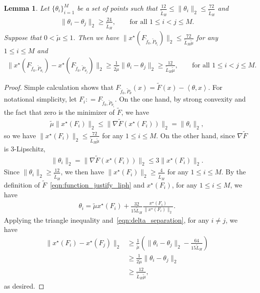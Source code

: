 \documentclass[11pt,twoside]{article}
\numberwithin{equation}{section}
\newcommand{\1}{\mathbf{1}}
\newcommand{\dotp}[1]{\left\langle #1\right\rangle}
\newtheorem{lemma}[theorem]{Lemma}
\theoremstyle{remark}
\theoremstyle{plain}
\begin{document}
\begin{lemma}\label{lem:far_noise_far_sol}
	Let $\{\theta_i\}_{i=1}^{M}$ be a set of points such that $\frac{12}{\tilde L_H} \le \|\theta_i\|_2 \le \frac{72}{\tilde L_H} $ and 
	\begin{align}\label{eqn:delta_separation}
		\|\theta_i - \theta_j\|_2\ge \frac{24}{\tilde L_H}, \qquad \text{for all } 1 \le i < j \le M.
	\end{align}
	Suppose that $0< \tilde \mu \le 1$.  Then we have $\|x^\star(F_{\tilde f_0, \tilde P_{\theta_i}}) \|_2 \le \frac{72}{\tilde L_H \tilde \mu}$  for any $1 \le i \le M$ and 
	\begin{align*}
		\| x^\star(F_{\tilde f_0, \tilde P_{\theta_i}}) - x^\star(F_{\tilde f_0, \tilde P_{\theta_j}})\|_2 \ge \frac{1}{2 \tilde \mu } \|\theta_i - \theta_j\|_2 \ge \frac{12}{\tilde L_H \tilde \mu}, \qquad \text{for all } 1 \le i < j \le M.
	\end{align*}
\end{lemma}
\begin{proof}
	Simple calculation shows that $F_{\tilde f_0, \tilde P_\theta}(x) =\tilde  F(x) - \dotp{\theta, x}$. For notational simplicity, let $F_i : = F_{\tilde f_0, \tilde P_{\theta_i}}$.
	On the one hand, by strong convexity and the fact that  zero is the minimizer of $\tilde F$, we have
	\begin{align*}
		\tilde \mu \|x^\star(F_i)\|_2  \le  \| \nabla \tilde F(x^\star(F_i))\|_2 =	\|\theta_i\|_2, 
	\end{align*}
	so we have $\|x^\star(F_i)\|_2 \le  \frac{72}{\tilde L_H \tilde \mu}$ for any $1\le i \le M$. 
	On the other hand, since $\nabla \tilde F$ is $3$-Lipschitz, 
	\begin{align*}
		\|\theta_i\|_2 = \| \nabla \tilde F(x^\star(F_i))\|_2 \le 3\|x^\star(F_i)\|_2.
	\end{align*}
	Since $\|\theta_i\|_2 \ge \frac{12}{\tilde L_H}$, we then have $\|x^\star(F_i)\|_2 \ge \frac{4}{\tilde L_H}$ for any $ 1 \le i \le M$. By the definition of $\tilde F$~\eqref{eqn:function_justify_liph} and $x^\star(F_i)$, for any $1\le i \le M$, we have
	\begin{align*}
		\theta_i  = \tilde\mu x^\star(F_i) + \frac{32}{15\tilde L_H} \frac{x^\star(F_i)}{\|x^\star(F_i)\|_2}.
	\end{align*}
	Applying the triangle inequality and~\eqref{eqn:delta_separation}, for any $i \neq j$, we have
	\begin{align*}
		\|x^\star(F_i) - x^\star(F_j) \|_2 &\ge \frac{1}{\tilde \mu} \left(\|\theta_i - \theta_j\|_2 - \frac{64}{15 \tilde L_H}\right)\\
		&\ge \frac{1}{2\tilde \mu} \|\theta_i - \theta_j\|_2\\
		&\ge \frac{12}{\tilde L_H \tilde\mu},
	\end{align*}
	as desired.
\end{proof}
\end{document}
